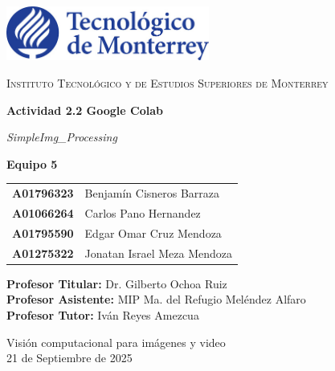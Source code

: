 \documentclass[12pt,letterpaper]{article}
\begin{document}
\begin{titlepage}
  \centering
  \vspace*{0.5cm}
  \includegraphics[width=0.5\textwidth]{logo.jpg}\par
  \vspace{1.2cm}

  {\Large\scshape Instituto Tecnológico y de Estudios Superiores de Monterrey\par}
  \vspace{2.2cm}

  {\huge\bfseries Actividad 2.2 Google Colab\par
   \vspace{0.2cm}
   \emph{SimpleImg\_Processing}\par}
  \vspace{2.2cm}

  \begin{center}
    {\Large\bfseries Equipo 5\par}
    \vspace{1em}
    \begin{tabular}{r l}
      \textbf{A01796323} & Benjamín Cisneros Barraza \\
      \textbf{A01066264} & Carlos Pano Hernandez \\
      \textbf{A01795590} & Edgar Omar Cruz Mendoza \\
      \textbf{A01275322} & Jonatan Israel Meza Mendoza \\
    \end{tabular}
  \end{center}
  
  \vspace{1.2cm}

  \begin{flushleft}
    \normalsize \textbf{Profesor Titular:} Dr. Gilberto Ochoa Ruiz\\
    \normalsize \textbf{Profesor Asistente:} MIP Ma. del Refugio Meléndez Alfaro\\
    \normalsize \textbf{Profesor Tutor:} Iván Reyes Amezcua
  \end{flushleft}

  \vfill

  \begin{flushright}
    \normalsize Visión computacional para imágenes y video\\
    \normalsize 21 de Septiembre de 2025
  \end{flushright}
\end{titlepage}
\end{document}
